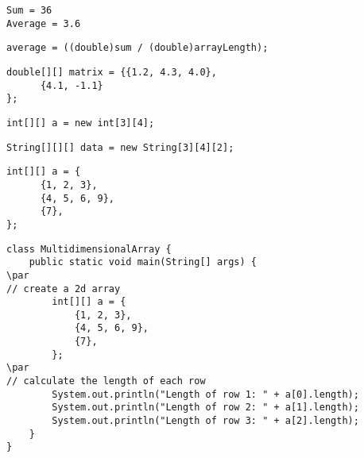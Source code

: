 \documentclass{book}
\def\lthtmlcheckvsize{\ifdim\ht\sizebox<\vsize 
  \ifdim\wd\sizebox<\hsize\expandafter\hfill\fi \expandafter\vfill
  \else\expandafter\vss\fi}%
\begin{document}
{\newpage\clearpage
{}%
\begin{lstlisting}
Sum = 36
Average = 3.6
\end{lstlisting}%
\lthtmlfigureZ
\lthtmlcheckvsize\clearpage}

{\newpage\clearpage
{}%
\begin{lstlisting}
average = ((double)sum / (double)arrayLength);
\end{lstlisting}%
\lthtmlfigureZ
\lthtmlcheckvsize\clearpage}

{\newpage\clearpage
{}%
\begin{lstlisting}
double[][] matrix = {{1.2, 4.3, 4.0}, 
      {4.1, -1.1}
};
\end{lstlisting}%
\lthtmlfigureZ
\lthtmlcheckvsize\clearpage}

{\newpage\clearpage
{}%
\begin{lstlisting}
int[][] a = new int[3][4];
\end{lstlisting}%
\lthtmlfigureZ
\lthtmlcheckvsize\clearpage}

{\newpage\clearpage
{}%
\begin{lstlisting}
String[][][] data = new String[3][4][2];
\end{lstlisting}%
\lthtmlfigureZ
\lthtmlcheckvsize\clearpage}

{\newpage\clearpage
{}%
\begin{lstlisting}
int[][] a = {
      {1, 2, 3}, 
      {4, 5, 6, 9}, 
      {7}, 
};
\end{lstlisting}%
\lthtmlfigureZ
\lthtmlcheckvsize\clearpage}

{\newpage\clearpage
{}%
\begin{lstlisting}
class MultidimensionalArray {
    public static void main(String[] args) {
\par
// create a 2d array
        int[][] a = {
            {1, 2, 3}, 
            {4, 5, 6, 9}, 
            {7}, 
        };
\par
// calculate the length of each row
        System.out.println("Length of row 1: " + a[0].length);
        System.out.println("Length of row 2: " + a[1].length);
        System.out.println("Length of row 3: " + a[2].length);
    }
}
\end{lstlisting}%
\lthtmlfigureZ
\lthtmlcheckvsize\clearpage}
\end{document}
